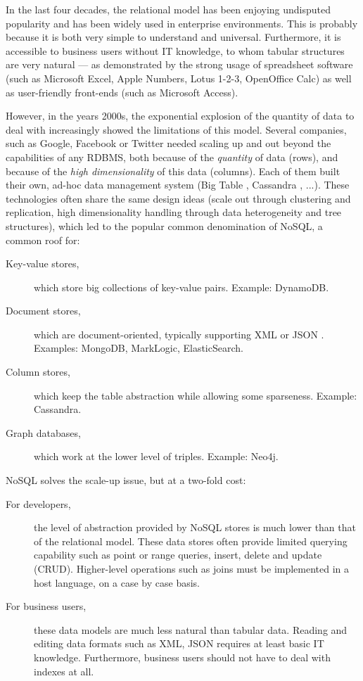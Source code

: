 \documentclass{acm_proc_article-sp}
\begin{document}
In the last four decades, the relational model has been enjoying undisputed popularity and has been widely used in enterprise environments. This is probably because it is both very simple to understand and universal. Furthermore, it is accessible to business users without IT knowledge, to whom tabular structures are very natural --- as demonstrated by the strong usage of spreadsheet software \cite{Mattessich1958} \cite{Mattessich1961} (such as Microsoft Excel, Apple Numbers, Lotus 1-2-3, OpenOffice Calc) as well as user-friendly front-ends (such as Microsoft Access).

However, in the years 2000s, the exponential explosion of the quantity of data to deal with increasingly showed the limitations of this model. Several companies, such as Google, Facebook or Twitter needed scaling up and out beyond the capabilities of any RDBMS, both because of the \emph{quantity} of data (rows), and because of the \emph{high dimensionality} of this data (columns). Each of them built their own, ad-hoc data management system (Big Table \cite{Chang2008}, Cassandra \cite{Lakshman2010}, ...). These technologies often share the same design ideas (scale out through clustering and replication, high dimensionality handling through data heterogeneity and tree structures), which led to the popular common denomination of NoSQL, a common roof for:
 \vspace{-\topsep}
\begin{description}
\item[Key-value stores,] which store big collections of key-value pairs. Example: DynamoDB.
\item[Document stores,] which are document-oriented, typically supporting XML \cite{XML} or JSON \cite{JSON}. Examples: MongoDB, MarkLogic, ElasticSearch.
\item[Column stores,] which keep the table abstraction while allowing some sparseness. Example: Cassandra.
\item[Graph databases,] which work at the lower level of triples. Example: Neo4j.
\end{description}

NoSQL solves the scale-up issue, but at a two-fold cost:
 \vspace{-\topsep}
\begin{description}
\item[For developers,] the level of abstraction provided by NoSQL stores is much lower than that of the relational model. These data stores often provide limited querying capability such as point or range queries, insert, delete and update (CRUD). Higher-level operations such as joins must be implemented in a host language, on a case by case basis.
\item[For business users,] these data models are much less natural than tabular data. Reading and editing data formats such as XML, JSON requires at least basic IT knowledge. Furthermore, business users should not have to deal with indexes at all.
\end{description}
\end{document}

